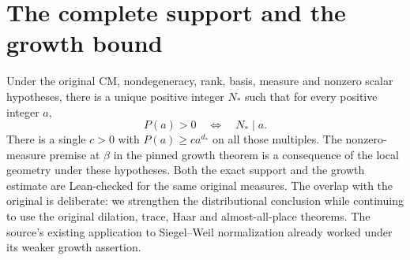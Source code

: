 \documentclass[12pt,letterpaper]{article}
\begin{document}
\section{The complete support and the growth bound}
Under the original CM, nondegeneracy, rank, basis, measure and nonzero scalar hypotheses, there is a unique positive integer $N_*$ such that for every positive integer $a$,
\[
 P(a)>0\quad\Longleftrightarrow\quad N_*\mid a .
\]
There is a single $c>0$ with $P(a)\ge c a^{d_*}$ on all those multiples. The nonzero-measure premise at $\beta$ in the pinned growth theorem is a consequence of the local geometry under these hypotheses. Both the exact support and the growth estimate are Lean-checked for the same original measures. The overlap with the original is deliberate: we strengthen the distributional conclusion while continuing to use the original dilation, trace, Haar and almost-all-place theorems. The source's existing application to Siegel--Weil normalization already worked under its weaker growth assertion.
\end{document}
